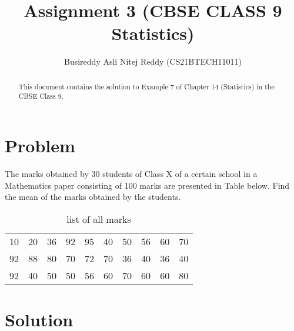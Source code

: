 \documentclass[journal,12pt,twocolumn]{IEEEtran}
\title{Assignment 3 (CBSE CLASS 9 Statistics) }
\author{Busireddy Asli Nitej Reddy (CS21BTECH11011)}
\date{}
\begin{document}
\maketitle

\begin{abstract}
This document contains the solution to Example 7 of Chapter 14 (Statistics) in the CBSE Class 9.
\end{abstract}

\section*{\textbf{Problem}}
     
        The marks obtained by 30 students of Class X of a certain school in a Mathematics paper consisting of 100 marks are presented in Table below. Find the mean of the marks obtained by the students.
        
        
       \begin{table}[!ht]
            \centering
            \resizebox{\columnwidth}{!}
            {
                \begin{tabular}{c c c c c c c c c c}
                  10 &20 &36 &92 &95 &40 &50 &56 &60 &70\\
                  92 &88 &80 &70 &72 &70 &36 &40 &36 &40\\
                  92 &40 &50 &50 &56 &60 &70 &60 &60 &80\\
                \end{tabular}
            }
            \caption{list of all marks}
            \label{table:table1}
       \end{table}



\section*{\textbf{Solution}}
       
\end{document}
